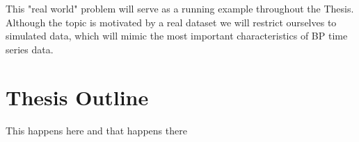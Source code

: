 This "real world" problem will serve as a running example throughout the Thesis.
Although the topic is motivated by a real dataset we will restrict ourselves to simulated data,
which will mimic the most important characteristics of BP time series data.


\section{Thesis Outline}

This happens here and that happens there











